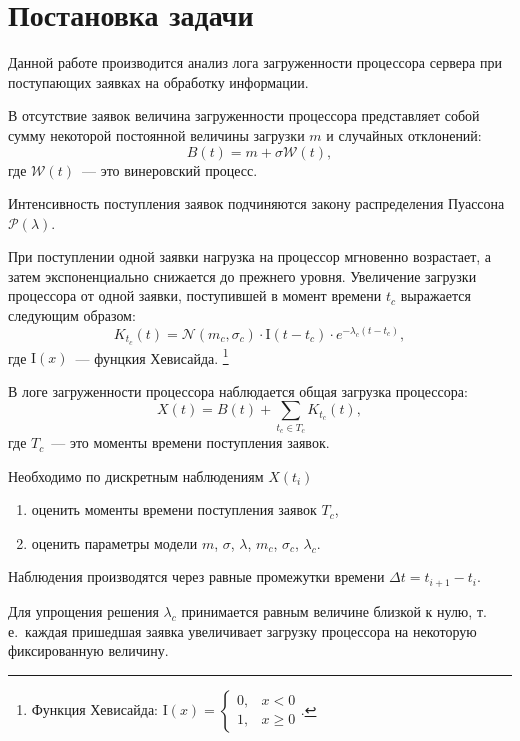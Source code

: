 \documentclass[a4paper,10pt]{article}
\begin{document}



\section{Постановка задачи}
Данной работе производится анализ лога загруженности процессора сервера
при поступающих заявках на обработку информации.

В отсутствие заявок величина загруженности процессора представляет собой 
сумму некоторой постоянной величины загрузки $m$ и случайных отклонений:
$$B(t) = m + \sigma \mathcal{W}(t),$$
где $\mathcal{W}(t)$~--- это винеровский процесс.

Интенсивность поступления заявок подчиняются закону
распределения Пуассона $\mathcal{P}(\lambda)$.

При поступлении одной заявки нагрузка на процессор мгновенно возрастает,
а затем экспоненциально снижается до прежнего уровня.
Увеличение загрузки процессора от одной заявки, 
поступившей в момент времени $t_c$ выражается следующим образом:
$$K_{t_c}(t) = \mathcal{N}(m_c, \sigma_c) \cdot \mathrm{I}(t - t_c) \cdot 
    e^{-\lambda_c(t - t_c)},$$
где $\mathrm{I}(x)$~--- фунцкия Хевисайда.%
\footnote{%
Функция Хевисайда: $\mathrm{I}(x) = \left\{
  \begin{array}{rl}
    0, & x < 0 \\
    1, & x \geqslant 0
  \end{array}\right.$.
}

В логе загруженности процессора наблюдается общая загрузка процессора:
$$X(t) = B(t) + \sum\limits_{t_c \in T_c}K_{t_c}(t),$$
где $T_c$~--- это моменты времени поступления заявок.

Необходимо по дискретным наблюдениям $X(t_i)$
\begin{enumerate}
 \item оценить моменты времени поступления заявок $T_c$,
 \item оценить параметры модели $m$, $\sigma$, $\lambda$, $m_c$, 
 $\sigma_c$, $\lambda_c$.
\end{enumerate}
Наблюдения производятся через равные промежутки времени 
$\Delta t = t_{i+1} - t_i.$

Для упрощения решения $\lambda_c$ принимается равным величине близкой к нулю,
т.\,е.~каждая пришедшая заявка увеличивает загрузку процессора на некоторую 
фиксированную величину.
\end{document}

